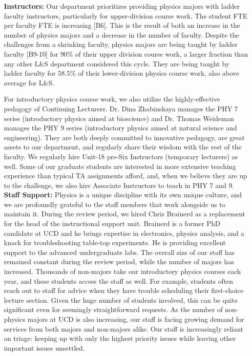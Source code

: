 \documentclass[12pt]{article}
\begin{document}
\noindent
{\bf Instructors:} Our department prioritizes providing physics majors
with ladder faculty instructors, particularly for upper-division
course work.  The student FTE per faculty FTE is increasing [B6].
This is the result of both an increase in the number of physics majors
and a decrease in the number of faculty.  Despite the challenges from
a shrinking faculty, physics majors are being taught by ladder faculty
[B9-10] for $90\%$ of their upper division course work, a larger
fraction than any other L\&S department considered this cycle.  They
are being taught by ladder faculty for $58.5\%$ of their
lower-division physics course work, also above average for L\&S.

For introductory physics course work, we also utilize the
highly-effective pedagogy of Continuing Lecturers.  Dr. Dina
Zhabinskaya manages the PHY 7 series (introductory physics aimed at
bioscience) and Dr. Thomas Weideman manages the PHY 9 series (introductory
physics aimed at natural science and engineering).  They are both
deeply committed to innovative pedagogy, are great assets to our
department, and regularly share their wisdom with the rest of the
faculty.  We regularly hire Unit-18 pre-Six Instructors (temporary
lecturers) as well.  Some of our graduate students are interested in
more extensive teaching experience than typical TA assignments afford,
and, when we believe they are up to the challenge, we also hire
Associate Instructors to teach in PHY 7 and 9.\\[3pt]

\noindent
{\bf Staff Support:} Physics is a unique discipline with its own
unique culture, and we are profoundly grateful to the staff members
that work alongside us to maintain it.  During the review period, we hired Chris Brainerd as a replacement for the head of the instructional support unit.  Brainerd is a former PhD candidate at UCD and he brings expertise in electronics, physics analysis, and a knack for troubleshooting table-top experiments.  He is providing excellent support to the advanced undergraduate labs. The overall size of our staff has remained constant during the review period, while the number of majors has increased.  Thousands of non-majors take our introductory physics courses each year, and these students access the staff as well.  For example, students often reach out to staff for advice when they have trouble scheduling their first-choice lecture section.  Given the huge number of students involved, this can be quite significant even for seemingly straightforward requests.  As the number of non-physics majors at UCD is also increasing, our staff is facing growing demand for services from both majors and non-majors alike.   Our staff is increasingly reliant on triage: keeping up with only the highest priority issues while leaving other important issues unsettled.\\[3pt]
\end{document}
